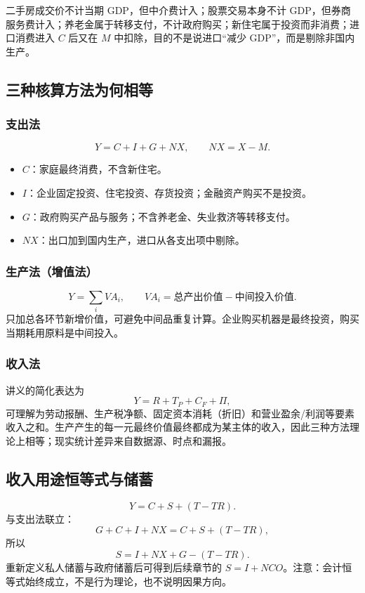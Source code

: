 \documentclass[UTF8,11pt,a4paper]{ctexart}
\begin{document}
\begin{warningbox}[高频边界]
二手房成交价不计当期 GDP，但中介费计入；股票交易本身不计 GDP，但券商服务费计入；养老金属于转移支付，不计政府购买；新住宅属于投资而非消费；进口消费进入 $C$ 后又在 $M$ 中扣除，目的不是说进口“减少 GDP”，而是剔除非国内生产。
\end{warningbox}

\subsection{三种核算方法为何相等}
\subsubsection{支出法}
\[
Y=C+I+G+NX,
\qquad NX=X-M.
\]
\begin{itemize}
  \item $C$：家庭最终消费，不含新住宅。
  \item $I$：企业固定投资、住宅投资、存货投资；金融资产购买不是投资。
  \item $G$：政府购买产品与服务；不含养老金、失业救济等转移支付。
  \item $NX$：出口加到国内生产，进口从各支出项中剔除。
\end{itemize}

\subsubsection{生产法（增值法）}
\[
Y=\sum_i VA_i,
\qquad VA_i=\text{总产出价值}-\text{中间投入价值}.
\]
只加总各环节新增价值，可避免中间品重复计算。企业购买机器是最终投资，购买当期耗用原料是中间投入。

\subsubsection{收入法}
讲义的简化表达为
\[
Y=R+T_P+C_F+\Pi,
\]
可理解为劳动报酬、生产税净额、固定资本消耗（折旧）和营业盈余/利润等要素收入之和。生产产生的每一元最终价值最终都成为某主体的收入，因此三种方法理论上相等；现实统计差异来自数据源、时点和漏报。

\subsection{收入用途恒等式与储蓄}
\[
Y=C+S+(T-TR).
\]
与支出法联立：
\[
G+C+I+NX=C+S+(T-TR),
\]
所以
\[
S=I+NX+G-(T-TR).
\]
重新定义私人储蓄与政府储蓄后可得到后续章节的 $S=I+NCO$。注意：会计恒等式始终成立，不是行为理论，也不说明因果方向。
\end{document}
